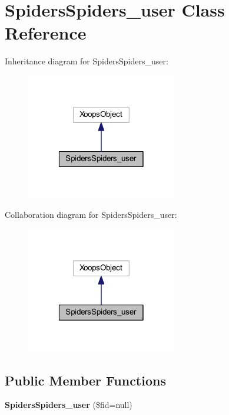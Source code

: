 \hypertarget{class_spiders_spiders__user}{\section{Spiders\-Spiders\-\_\-user Class Reference}
\label{class_spiders_spiders__user}
}


Inheritance diagram for Spiders\-Spiders\-\_\-user\-:
\nopagebreak
\begin{figure}[H]
\begin{center}
\leavevmode
\includegraphics[width=186pt]{class_spiders_spiders__user__inherit__graph}
\end{center}
\end{figure}


Collaboration diagram for Spiders\-Spiders\-\_\-user\-:
\nopagebreak
\begin{figure}[H]
\begin{center}
\leavevmode
\includegraphics[width=186pt]{class_spiders_spiders__user__coll__graph}
\end{center}
\end{figure}
\subsection*{Public Member Functions}
\begin{DoxyCompactItemize}
\item 
\hypertarget{class_spiders_spiders__user_a7b0cebdbf14e06201c2c73c20044b147}{{\bfseries Spiders\-Spiders\-\_\-user} (\$fid=null)}\label{class_spiders_spiders__user_a7b0cebdbf14e06201c2c73c20044b147}

\end{DoxyCompactItemize}


